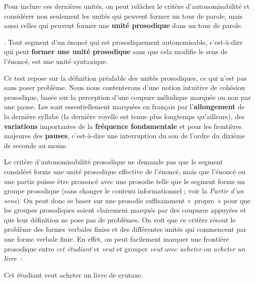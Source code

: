 Pour inclure ces dernières unités, on peut relâcher le critère d’autonomisabilité et considérer non seulement les unités qui peuvent former un tour de parole, mais aussi celles qui peuvent former une \textbf{unité prosodique} dans un tour de parole.

\begin{styleLivreImportant}
. Tout segment d’un énoncé qui est prosodiquement autonomisable, c’est-à-dire qui peut \textbf{former une unité prosodique} sans que cela modifie le sens de l’énoncé, est une unité syntaxique.
\end{styleLivreImportant}

Ce test repose sur la définition préalable des unités prosodiques, ce qui n’est pas sans poser problème. Nous nous contenterons d’une notion intuitive de cohésion prosodique, basée sur la perception d’une coupure mélodique marquée ou non par une pause. Les  sont essentiellement marquées en français par l’\textbf{allongement} de la dernière syllabe (la dernière voyelle est tenue plus longtemps qu’ailleurs), des \textbf{variations} importantes de la \textbf{fréquence fondamentale} et pour les frontières majeures des \textbf{pauses}, c’est-à-dire une interruption du son de l’ordre du dixième de seconde au moins.

Le critère d’autonomisabilité prosodique ne demande pas que le segment considéré forme une unité prosodique effective de l’énoncé, mais que l’énoncé ou une partie puisse être prononcé avec une prosodie telle que le segment forme un groupe prosodique (sans changer le contenu informationnel ; voir la  \textit{Partir d’un sens}). On peut donc se baser sur une prosodie suffisamment «~propre~» pour que les groupes prosodiques soient clairement marqués par des coupures appuyées et que leur définition ne pose pas de problèmes. On voit que ce critère résout le problème des formes verbales finies et des différentes unités qui commencent par une forme verbale finie. En effet, on peut facilement marquer une frontière prosodique entre \textit{cet étudiant} et \textit{veut} et grouper \textit{veut} avec \textit{acheter} ou \textit{acheter un livre~}:

\ea
    {Cet étudiant} {\textbar} {veut acheter} {\textbar} {un livre de syntaxe}.
\z

